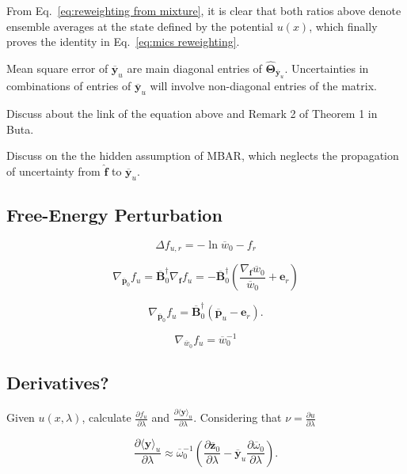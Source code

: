 \documentclass[journal=jctcce,manuscript=article,layout=twocolumn]{achemso}
\newcommand{\mt}[1]{\boldsymbol{\mathbf{#1}}}   %
\newcommand{\vt}[1]{\boldsymbol{\mathbf{#1}}}   %
\newcommand{\diff}[2]{\frac{\partial #1}{\partial #2}} %
\newcommand{\avg}[1]{\overline{#1}}             %
\begin{document}
From Eq.~\eqref{eq:reweighting from mixture}, it is clear that both ratios above denote ensemble averages at the state defined by the potential $u(x)$, which finally proves the identity in Eq.~\eqref{eq:mics reweighting}.


Mean square error of $\avg{\vt y}_u$ are main diagonal entries of $\hat{\mt \Theta}_{\avg{\vt y}_u}$. Uncertainties in combinations of entries of $\avg{\vt y}_u$ will involve non-diagonal entries of the matrix.

Discuss about the link of the equation above and Remark 2 of Theorem 1 in Buta.\cite{Buta_2010}

Discuss on the the hidden assumption of MBAR, which neglects the propagation of uncertainty from $\hat{\vt f}$ to $\avg{\vt y}_u$.

\subsection{Free-Energy Perturbation}

\begin{equation*}
\Delta f_{u,r} = -\ln \avg{w}_0 - f_r
\end{equation*}

\begin{equation*}
\nabla_{\avg{\vt p}_0}{f_u} = \avg{\mt B}_0^\dag \nabla_{\vt f}{f_u} = -\avg{\mt B}_0^\dag \left({\frac{\nabla_{\vt f} \avg{w}_0}{\avg{w}_0}} + {\vt e}_r \right)
\end{equation*}

\begin{equation*}
\nabla_{\avg{\vt p}_0}{f_u} = \avg{\mt B}_0^\dag (\avg{\vt p}_u - {\vt e}_r).
\end{equation*}


\begin{equation*}
\nabla_{\avg{w}_0}{f_u} = \avg{w}_0^{-1}
\end{equation*}


\subsection{Derivatives?}

Given $u(x,\lambda)$, calculate $\frac{\partial f_u}{\partial \lambda}$ and $\frac{\partial \langle \vt y \rangle_u}{\partial \lambda}$. Considering that $\nu = \diff{u}{\lambda}$

\begin{equation*}
\diff{\langle \vt y \rangle_u}{\lambda} \approx \avg{\omega}_0^{-1} \left( \diff{\avg{\vt z}_0}{\lambda} - \avg{\vt y}_u \diff{\avg{\omega}_0}{\lambda} \right).
\end{equation*}
\end{document}

